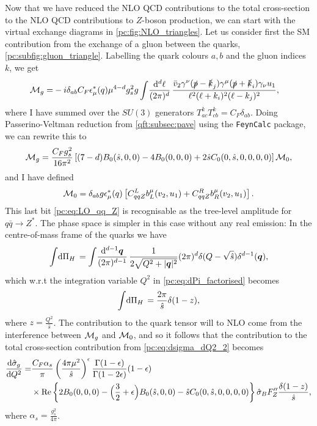 \documentclass[../main.tex]{subfiles}
\begin{document}
Now that we have reduced the NLO QCD contributions to the total cross-section to the NLO QCD contributions to \(Z\)-boson production, we can start with the virtual exchange diagrams in \cref{pc:fig:NLO_triangles}.
Let us consider first the SM contribution from the exchange of a gluon between the quarks, \cref{pc:subfig:gluon_triangle}.
Labelling the quark colours \(a, b\) and the gluon indices \(k\), we get
\begin{align}
  \M_g = & -i\delta_{ab} C_F \epsilon_\mu^\ast(q) \mu^{4-d} g_s^2 g \loopintegral[d]{\ell} \frac{\bar{v}_2 \gamma^\nu (\slashed{p}-\slashed{k}_j) \gamma^\mu (\slashed{p}+\slashed{k}_i) \gamma_\nu u_1}{\ell^2(\ell+k_i)^2(\ell-k_j)^2},
\end{align}
where I have summed over the \(SU(3)\) generators \(T_{ac}^k T_{cb}^k = C_F \delta_{ab}\).
Doing Passerino-Veltman reduction from \cref{qft:subsec:pave} using the \verb|FeynCalc| package, we can rewrite this to
\begin{equation}
  \M_g = \frac{C_F g_s^2}{16\pi^2} \bclosed{(7-d)B_0(\hat{s},0,0) - 4B_0(0,0,0) + 2\hat{s}C_0(0,\hat{s},0,0,0,0)} \M_0,
\end{equation}
and I have defined
\begin{equation}
  \label{pc:eq:LO_qq_Z}
  \M_0 = \delta_{ab} g \epsilon_\mu^\ast(q) \bclosed{C_{qqZ}^L b_L^\mu(v_2, u_1) + C_{qqZ}^R b_R^\mu(v_2, u_1)}.
\end{equation}
This last bit \cref{pc:eq:LO_qq_Z} is recognisable as the tree-level amplitude for \(q\bar{q} \to Z^\ast\).
The phase space is simpler in this case without any real emission: In the centre-of-mass frame of the quarks we have
\begin{equation}
  \integral{\Pi_H} = \loopintegral[d-1]{\vec{q}} \frac{1}{2\sqrt{Q^2+|\vec{q}|^2}} (2\pi)^d \delta(Q - \sqrt{\hat{s}}) \delta^{d-1}(\vec{q}),
\end{equation}
which w.r.t the integration variable \(Q^2\) in \cref{pc:eq:dPi_factorised} becomes
\begin{equation}
  \integral{\Pi_H} = \frac{2\pi}{\hat{s}} \delta(1-z),
\end{equation}
where \(z = \frac{Q^2}{\hat{s}}\).
The contribution to the quark tensor will to NLO come from the interference between \(\M_g\) and \(\M_0\), and so it follows that the contribution to the total cross-section contribution from \cref{pc:eq:dsigma_dQ2_2} becomes
\begin{align}
  \nonumber
  \d[Q^2]{\hat\sigma_g} = & \frac{C_F \alpha_s}{\pi} \pclosed{\frac{4\pi \mu^2}{\hat{s}}}^\epsilon \frac{\Gamma(1-\epsilon)}{\Gamma(1-2\epsilon)} (1-\epsilon)                                       \\
                          & \times \Re{2B_0(0,0,0) - \Bigl(\frac{3}{2}+\epsilon\Bigr)B_0(\hat{s},0,0) - \hat{s} C_0(0,\hat{s},0,0,0,0)} \hat\sigma_B F^{\prime\prime}_Z \frac{\delta(1-z)}{\hat{s}},
\end{align}
where \(\alpha_s = \frac{g_s^2}{4\pi}\).
\end{document}
